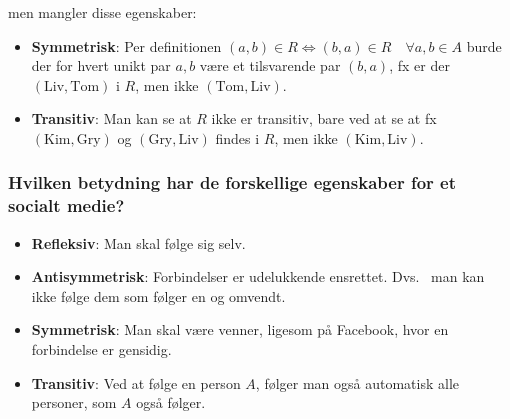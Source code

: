men mangler disse egenskaber:

\begin{itemize}
    \item \textbf{Symmetrisk}: Per definitionen \((a, b) \in R \iff (b, a) \in R \quad\forall a, b \in A\) burde der
          for hvert unikt par \(a, b\) være et tilsvarende par \((b, a)\), fx er der \((\text{Liv}, \text{Tom})\) i \(R\),
          men ikke \((\text{Tom}, \text{Liv})\).
    \item \textbf{Transitiv}: Man kan se at \(R\) ikke er transitiv, bare ved at se at fx
          \((\text{Kim}, \text{Gry})\) og \((\text{Gry}, \text{Liv})\) findes i \(R\), men ikke \((\text{Kim},
          \text{Liv})\).
\end{itemize}

\subsubsection{Hvilken betydning har de forskellige egenskaber for et socialt medie?}

\begin{itemize}
    \item \textbf{Refleksiv}: Man skal følge sig selv.
    \item \textbf{Antisymmetrisk}: Forbindelser er udelukkende ensrettet.
          Dvs.
          \ man kan ikke følge dem som følger en og omvendt.
    \item \textbf{Symmetrisk}: Man skal være venner, ligesom på Facebook, hvor en forbindelse er gensidig.
    \item \textbf{Transitiv}: Ved at følge en person \(A\), følger man også automatisk alle personer, som \(A\) også
          følger.
\end{itemize}
